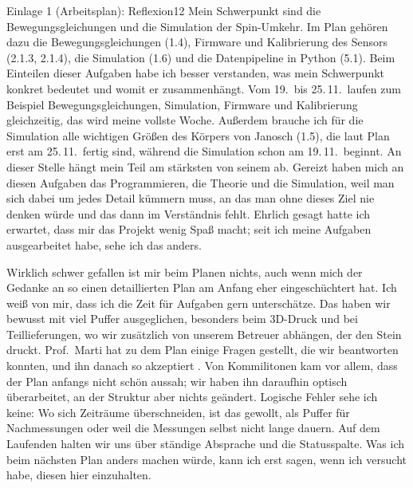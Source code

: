 \begin{umfang}{Einlage 1 (Arbeitsplan): Reflexion}{1}{2}
Mein Schwerpunkt sind die Bewegungsgleichungen und die Simulation der Spin-Umkehr. Im Plan gehören dazu die
Bewegungsgleichungen (1.4), Firmware und Kalibrierung des Sensors (2.1.3, 2.1.4), die Simulation (1.6) und
die Datenpipeline in Python (5.1). Beim Einteilen dieser Aufgaben habe ich besser verstanden, was mein
Schwerpunkt konkret bedeutet und womit er zusammenhängt. Vom 19.\ bis 25.\,11.\ laufen zum Beispiel
Bewegungsgleichungen, Simulation, Firmware und Kalibrierung gleichzeitig, das wird meine vollste Woche.
Außerdem brauche ich für die Simulation alle wichtigen Größen des Körpers von Janosch (1.5), die laut Plan
erst am 25.\,11.\ fertig sind, während die Simulation schon am 19.\,11.\ beginnt. An dieser Stelle hängt mein
Teil am stärksten von seinem ab. Gereizt haben mich an diesen Aufgaben das Programmieren, die Theorie und die
Simulation, weil man sich dabei um jedes Detail kümmern muss, an das man ohne dieses Ziel nie denken würde
und das dann im Verständnis fehlt. Ehrlich gesagt hatte ich erwartet, dass mir das Projekt wenig Spaß macht;
seit ich meine Aufgaben ausgearbeitet habe, sehe ich das anders.

Wirklich schwer gefallen ist mir beim Planen nichts, auch wenn mich der Gedanke an so einen detaillierten
Plan am Anfang eher eingeschüchtert hat. Ich weiß von mir, dass ich die Zeit für Aufgaben gern unterschätze.
Das haben wir bewusst mit viel Puffer ausgeglichen, besonders beim 3D-Druck und bei Teillieferungen, wo wir
zusätzlich von unserem Betreuer abhängen, der den Stein druckt. Prof.~Marti hat zu dem Plan einige Fragen
gestellt, die wir beantworten konnten, und ihn danach so akzeptiert \cite{Marti2026Gespraech}. Von
Kommilitonen kam vor allem, dass der Plan anfangs nicht schön aussah; wir haben ihn daraufhin optisch
überarbeitet, an der Struktur aber nichts geändert. Logische Fehler sehe ich keine: Wo sich Zeiträume
überschneiden, ist das gewollt, als Puffer für Nachmessungen oder weil die Messungen selbst nicht lange
dauern. Auf dem Laufenden halten wir uns über ständige Absprache und die Statusspalte. Was ich beim nächsten
Plan anders machen würde, kann ich erst sagen, wenn ich versucht habe, diesen hier einzuhalten.
\end{umfang}

